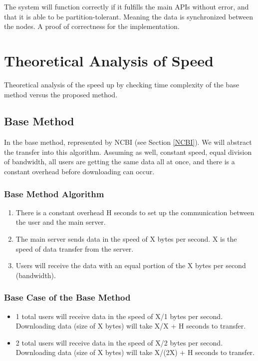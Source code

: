 \documentclass[acmsmall]{acmart}
\begin{document}
\begin{multicols}{2}
The system will function correctly if it fulfills the main APIs without error, and that it is able to be partition-tolerant. Meaning the data is synchronized between the nodes. A proof of correctness for the implementation.

\section{Theoretical Analysis of Speed} 

Theoretical analysis of the speed up by checking time complexity of the base method versus the proposed method.

\subsection{Base Method}
In the base method, represented by NCBI (see Section \ref{NCBI}). We will abstract the transfer into this algorithm. Assuming as well, constant speed, equal division of bandwidth, all users are getting the same data all at once, and there is a constant overhead before downloading can occur.

\subsubsection{Base Method Algorithm}
\begin{enumerate}
    \item There is a constant overhead H seconds to set up the communication between the user and the main server.
    \item The main server sends data in the speed of X bytes per second. X is the speed of data transfer from the server.
    \item Users will receive the data with an equal portion of the X bytes per second (bandwidth).
\end{enumerate}

\subsubsection{Base Case of the Base Method}
    \begin{itemize} 
        \item 1 total users will receive data in the speed of X/1 bytes per second. Downloading data (size of X bytes) will take X/X + H seconds to transfer.
        \item 2 total users will receive data in the speed of X/2 bytes per second. Downloading data (size of X bytes) will take X/(2X) + H seconds to transfer.
    \end{itemize}


\end{multicols}
\end{document}
